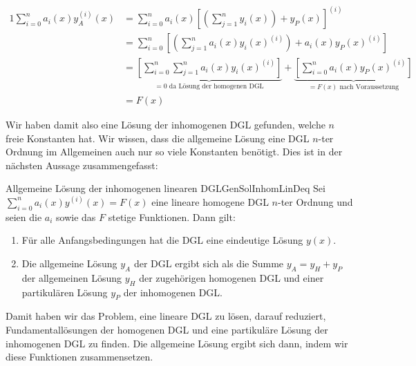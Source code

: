 \begin{alignat*}{1}
    \sum\limits_{i=0}^n a_i(x) y_A^{(i)}(x) &= \sum\limits_{i=0}^n a_i(x) \left[\left(\sum\limits_{j=1}^n y_i(x)\right) + y_P(x)\right]^{(i)} \\
                                            &= \sum\limits_{i=0}^n \left[ \left(\sum\limits_{j=1}^n a_i(x) y_i(x)^{(i)} \right) + a_i(x) y_P(x)^{(i)} \right] \\
                                            &=  \underbrace{\left[ \sum\limits_{i=0}^n \sum\limits_{j=1}^n a_i(x) y_i(x)^{(i)} \right]}_{=0 \text{ da Lösung der homogenen DGL}} +  \underbrace{\left[ \sum\limits_{i=0}^n a_i(x) y_P(x)^{(i)}  \right]}_{=F(x) \text{ nach Voraussetzung}} \\
                                            &= F(x)
\end{alignat*}

Wir haben damit also eine Lösung der inhomogenen DGL gefunden, welche $n$ freie Konstanten hat. Wir wissen, dass die allgemeine Lösung eine DGL $n$-ter Ordnung im Allgemeinen auch nur so viele Konstanten benötigt. Dies ist in der nächsten Aussage zusammengefasst:

\begin{statement}{Allgemeine Lösung der inhomogenen linearen DGL}{GenSolInhomLinDeq}
    Sei $\sum\limits_{i=0}^n a_i(x) y^{(i)}(x) = F(x)$ eine lineare homogene DGL $n$-ter Ordnung und seien die $a_i$ sowie das $F$ stetige Funktionen. Dann gilt:
    \begin{enumerate}
        \item Für alle Anfangsbedingungen hat die DGL eine eindeutige Lösung $y(x)$.
        \item Die allgemeine Lösung $y_A$ der DGL ergibt sich als die Summe $y_A = y_H + y_P$ der allgemeinen Lösung $y_H$ der zugehörigen homogenen DGL und einer partikulären Lösung $y_P$ der inhomogenen DGL.
    \end{enumerate}
\end{statement}

Damit haben wir das Problem, eine lineare DGL zu lösen, darauf reduziert, Fundamentallösungen der homogenen DGL und eine partikuläre Lösung der inhomogenen DGL zu finden. Die allgemeine Lösung ergibt sich dann, indem wir diese Funktionen zusammensetzen.

